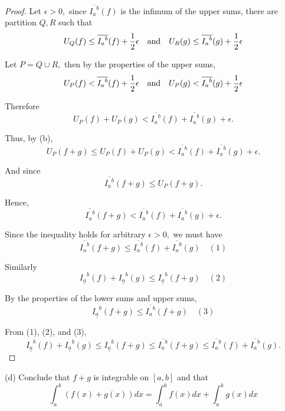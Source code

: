 \documentclass{article}
\begin{document}
\begin{proof}
    Let $\epsilon > 0,$ since $\overline{{I_a}^b}(f)$ is the infimum of the upper sums, there are partition $Q, R$ such that
    \[
        U_Q(f) \le \overline{{I_a}^b}(f) + \frac{1}{2} \epsilon \quad \text{and} \quad 
        U_R(g) \le \overline{{I_a}^b}(g) + \frac{1}{2} \epsilon\\
    \]

    Let $P = Q \cup R,$ then by the properties of the upper sums,
    \[
        U_P(f) < \overline{{I_a}^b}(f) + \frac{1}{2} \epsilon \quad \text{and} \quad U_P(g) < \overline{{I_a}^b}(g) + \frac{1}{2} \epsilon
    \]

    Therefore
    \[
        U_P(f) + U_P(g) < \overline{{I_a}^b}(f) + \overline{{I_a}^b}(g) + \epsilon.
    \]

    Thus, by (b),
    \[
        U_P(f+g) \le U_P(f) + U_P(g) < \overline{{I_a}^b}(f) + \overline{{I_a}^b}(g) + \epsilon.
    \]

    And since 
    \[
        \overline{{I_a}^b}(f+g) \le U_P(f+g).
    \]

    Hence,
    \[
        \overline{{I_a}^b}(f+g) < \overline{{I_a}^b}(f) + \overline{{I_a}^b}(g) + \epsilon.
    \]

    Since the inequality holds for arbitrary $\epsilon > 0,$ we must have
    \[
        \overline{{I_a}^b}(f+g) \le \overline{{I_a}^b}(f) + \overline{{I_a}^b}(g) \quad (1)
    \]

    Similarly 
    \[
        \underline{{I_a}^b}(f) + \underline{{I_a}^b}(g) \le \underline{{I_a}^b}(f+g) \quad (2)
    \]

    By the properties of the lower sums and upper sums,
    \[
        \underline{{I_a}^b}(f+g) \le \overline{{I_a}^b}(f+g) \quad (3)
    \]

    From (1), (2), and (3),
    \[
        \underline{{I_a}^b}(f) + \underline{{I_a}^b}(g) \le \underline{{I_a}^b}(f+g) 
        \le \overline{{I_a}^b}(f+g) \le \overline{{I_a}^b}(f) + \overline{{I_a}^b}(g).
    \]
\end{proof}

\newpage

\begin{problem*}[4d]
    (d) Conclude that $f + g$ is integrable on $[a, b]$ and that
    \[
        \int_{a}^{b} (f(x) + g(x)) dx = \int_{a}^{b} f(x) dx + \int_{a}^{b} g(x) dx
    \]
\end{problem*}
\end{document}
